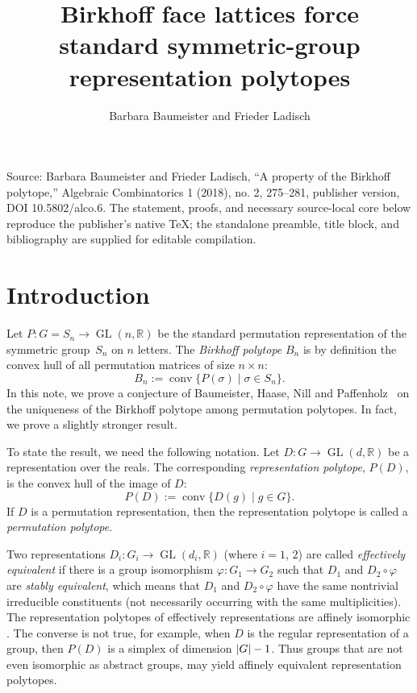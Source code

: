 \documentclass[10pt]{amsart}
\renewcommand{\phi}{\varphi}
\newcommand{\reals}{\mathbb{R}}
\DeclarePairedDelimiter{\card}{\lvert}{\rvert}
\DeclareMathOperator{\GL}{GL}
\DeclareMathOperator{\conv}{conv}
\begin{document}
\title{Birkhoff face lattices force standard symmetric-group representation polytopes}
\author{Barbara Baumeister and Frieder Ladisch}
\date{}
\maketitle
\noindent Source: Barbara Baumeister and Frieder Ladisch, ``A property of the Birkhoff polytope,'' Algebraic Combinatorics 1 (2018), no. 2, 275--281, publisher version, DOI 10.5802/alco.6. The statement, proofs, and necessary source-local core below reproduce the publisher's native TeX; the standalone preamble, title block, and bibliography are supplied for editable compilation.
\section{Introduction}
Let $P\colon G= S_n \to \GL(n,\reals)$ be the 
standard permutation representation of 
the symmetric group~$S_n$ on $n$ letters.
The \emph{Birkhoff polytope} $B_n$ is by definition
the convex hull of all permutation matrices of size $n\times n$:
\[ B_n := \conv\{ P(\sigma) \mid \sigma\in S_n\}.
\]
In this note, we prove a conjecture of
Baumeister, Haase, Nill and Paffenholz~\cite[Conjecture~5.3]{BHNP09}
on the uniqueness of the Birkhoff polytope among
permutation polytopes.
In fact, we prove a slightly stronger result.

To state the result, we need the following notation.
Let $D\colon G\to \GL(d,\reals)$
be a representation over the reals.
The corresponding \emph{representation polytope},
$P(D)$, is the convex hull of the image of $D$:
\[ P(D):= \conv\{ D(g) \mid g\in G
               \}.
\]
If $D$ is a permutation representation, then the 
representation polytope is called a 
\emph{permutation polytope}.

Two representations 
$D_i\colon G_i \to \GL(d_i,\reals)$
(where $i=1$, $2$) are called 
\emph{effectively equivalent} if there is 
a group isomorphism $\phi\colon G_1\to G_2$
such that $D_1$ and $D_2\circ \phi$ are 
\emph{stably equivalent},
which means that $D_1$ and $D_2\circ \phi$ 
have the same nontrivial irreducible constituents 
(not necessarily occurring with the same multiplicities).
The representation polytopes of effectively representations are
affinely isomorphic
\cite[Theorem~2.4]{BaumeisterGrueninger15} \cite[\S~2]{BHNP09}.
The converse is not true, for example, 
when $D$ is the regular representation of a group,
then $P(D)$ is a simplex of dimension $\card{G}-1$.
Thus groups that are not even isomorphic as abstract groups,
may yield affinely equivalent representation polytopes.
\end{document}
